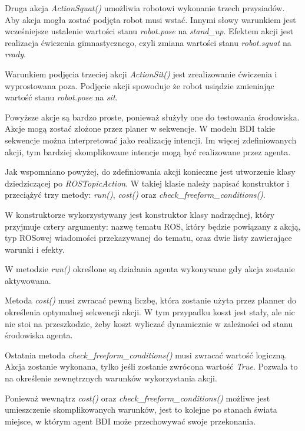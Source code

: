 Druga akcja \textit{ActionSquat()} umożliwia robotowi wykonanie trzech przysiadów. Aby akcja mogła zostać podjęta robot musi wstać. Innymi słowy warunkiem jest wcześniejsze ustalenie wartości stanu \textit{robot.pose} na \textit{stand\_up}. Efektem akcji jest realizacja ćwiczenia gimnastycznego, czyli zmiana wartości stanu \textit{robot.squat} na \textit{ready}. 

Warunkiem podjęcia trzeciej akcji \textit{ActionSit()} jest zrealizowanie ćwiczenia i wyprostowana poza. Podjęcie akcji spowoduje że robot usiądzie zmieniając wartość stanu \textit{robot.pose} na \textit{sit}. 

Powyższe akcje są bardzo proste, ponieważ służyły one do testowania środowiska. %
Akcje mogą zostać złożone przez planer w sekwencje. W modelu BDI takie sekwencje można interpretować jako realizację intencji. Im więcej zdefiniowanych akcji, tym bardziej skomplikowane intencje mogą być realizowane przez agenta.


Jak wspomniano powyżej, do zdefiniowania akcji konieczne jest utworzenie klasy dziedziczącej po \textit{ROSTopicAction}. W takiej klasie należy napisać konstruktor i przeciążyć trzy metody: \textit{run()}, \textit{cost()} oraz \textit{check\_freeform\_conditions()}. 

W konstruktorze wykorzystywany jest konstruktor klasy nadrzędnej, który przyjmuje cztery argumenty: nazwę tematu ROS, który będzie powiązany z akcją, typ ROSowej wiadomości przekazywanej do tematu, oraz dwie listy zawierające warunki i efekty. 

W metodzie \textit{run()} określone są działania agenta wykonywane gdy akcja zostanie aktywowana. 

Metoda \textit{cost()} musi zwracać pewną liczbę, która zostanie użyta przez planner do określenia optymalnej sekwencji akcji. W tym przypadku koszt jest stały, ale nic nie stoi na przeszkodzie, żeby koszt wyliczać dynamicznie w zależności od stanu środowiska agenta.

Ostatnia metoda \textit{check\_freeform\_conditions()} musi zwracać wartość logiczną. Akcja zostanie wykonana, tylko jeśli zostanie zwrócona wartość \textit{True}. Pozwala to na określenie zewnętrznych warunków wykorzystania akcji.

Ponieważ wewnątrz \textit{cost()} oraz \textit{check\_freeform\_conditions()} możliwe jest umieszczenie skomplikowanych warunków, jest to kolejne po stanach świata miejsce, w którym agent BDI może przechowywać swoje przekonania.


